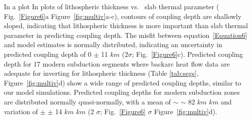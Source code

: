 \documentclass[draft,linenumbers]{agujournal2018} %
\providecommand{\DIFaddtex}[1]{{\protect\color{blue} \sf #1}} %
\providecommand{\DIFdeltex}[1]{{\protect\color{red} \scriptsize #1}} %
\providecommand{\DIFaddbegin}{} %
\providecommand{\DIFaddend}{} %
\providecommand{\DIFdelbegin}{} %
\providecommand{\DIFdelend}{} %
\providecommand{\DIFadd}[1]{\texorpdfstring{\DIFaddtex{#1}}{#1}} %
\providecommand{\DIFdel}[1]{\texorpdfstring{\DIFdeltex{#1}}{}} %
\newcommand{\DIFscaledelfig}{0.3}
\newlength{\DIFdelgraphicswidth} %
\newlength{\DIFdelgraphicsheight} %
\newcommand{\DIFaddincludegraphics}[2][]{{\color{blue}\fbox{\DIFOincludegraphics[#1]{#2}}}} %
\newcommand{\DIFdelincludegraphics}[2][]{%
\sbox{\DIFdelgraphicsbox}{\DIFOincludegraphics[#1]{#2}}%
\settoboxwidth{\DIFdelgraphicswidth}{\DIFdelgraphicsbox} %
\settoboxtotalheight{\DIFdelgraphicsheight}{\DIFdelgraphicsbox} %
\scalebox{\DIFscaledelfig}{%
\parbox[b]{\DIFdelgraphicswidth}{\usebox{\DIFdelgraphicsbox}\\[-\baselineskip] \rule{\DIFdelgraphicswidth}{0em}}\llap{\resizebox{\DIFdelgraphicswidth}{\DIFdelgraphicsheight}{%
\setlength{\unitlength}{\DIFdelgraphicswidth}%
\begin{picture}(1,1)%
\thicklines\linethickness{2pt} %
{\color[rgb]{1,0,0}\put(0,0){\framebox(1,1){}}}%
{\color[rgb]{1,0,0}\put(0,0){\line( 1,1){1}}}%
{\color[rgb]{1,0,0}\put(0,1){\line(1,-1){1}}}%
\end{picture}%
}\hspace*{3pt}}} %
} %
\DeclareRobustCommand{\DIFaddbegin}{\DIFOaddbegin \let\includegraphics\DIFaddincludegraphics} %
\DeclareRobustCommand{\DIFaddend}{\DIFOaddend \let\includegraphics\DIFOincludegraphics} %
\DeclareRobustCommand{\DIFdelbegin}{\DIFOdelbegin \let\includegraphics\DIFdelincludegraphics} %
\DeclareRobustCommand{\DIFdelend}{\DIFOaddend \let\includegraphics\DIFOincludegraphics} %
\begin{document}
\DIFdelbegin %

\DIFdel{In a plot }\DIFdelend \DIFaddbegin \DIFadd{In plots }\DIFaddend of lithospheric thickness vs.\DIFaddbegin \DIFadd{~}\DIFaddend slab thermal parameter
(\DIFdelbegin \DIFdel{Fig.~\ref{Figure6}a}\DIFdelend \DIFaddbegin \DIFadd{Figure~\ref{fig:multiv}a-c}\DIFaddend ), contours of coupling depth are shallowly
sloped, indicating that lithospheric thickness is more important than
slab thermal parameter in predicting coupling depth. \DIFdelbegin \DIFdel{The misfit between equation~\ref{Equation6} and model estimates is normally distributed, indicating an uncertainty in predicted coupling depth of 0 $\pm$ 11 $km$ (2$\sigma$; Fig.~\ref{Figure6}c). }\DIFdelend Predicted coupling
depth for 17 modern subduction segments where backarc heat flow data are
adequate for inverting for lithospheric thickness \DIFdelbegin %
\DIFdelend \DIFaddbegin \DIFadd{(Table \ref{tab:segs},
Figure~\ref{fig:multiv}d) }\DIFaddend show a wide range of predicted coupling
depths, similar to our model simulations. Predicted coupling depths for
modern subduction zones are distributed \DIFdelbegin \DIFdel{normally}\DIFdelend \DIFaddbegin \DIFadd{quasi-normally}\DIFaddend , with a mean of
\DIFdelbegin \DIFdel{$\sim$}\DIFdelend \DIFaddbegin \DIFadd{\(\sim\) }\DIFaddend 82 \DIFdelbegin \DIFdel{$km$ }\DIFdelend \DIFaddbegin \DIFadd{\(km\) }\DIFaddend and variation of \DIFdelbegin \DIFdel{$\pm$ }\DIFdelend \DIFaddbegin \DIFadd{\(\pm\) }\DIFaddend 14 \DIFdelbegin \DIFdel{$km$ }\DIFdelend \DIFaddbegin \DIFadd{\(km\) }\DIFaddend (2\DIFdelbegin \DIFdel{$\sigma$; Fig.~\ref{Figure6}}\DIFdelend \DIFaddbegin \DIFadd{\(\sigma\)
Figure~\ref{fig:multiv}}\DIFaddend d).
\end{document}
